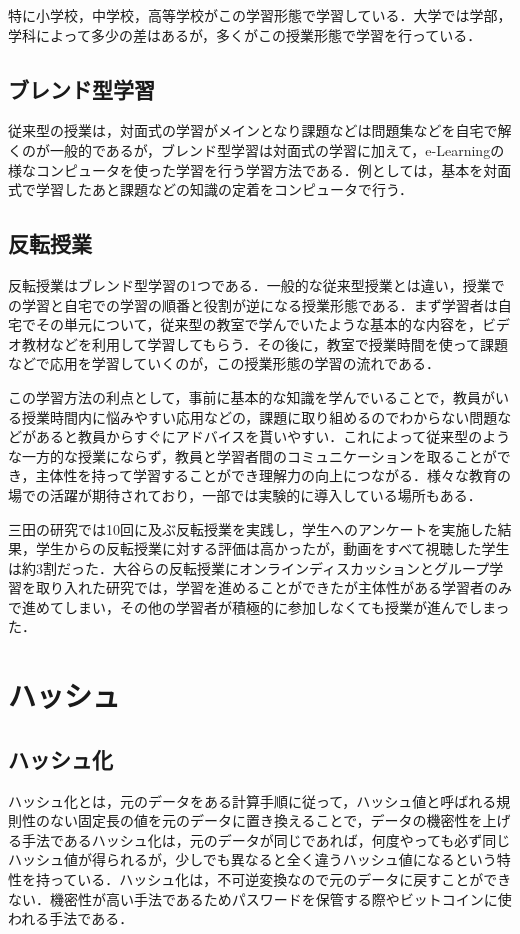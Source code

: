 \documentclass[a4j,11pt]{jsarticle}
\begin{document}
特に小学校，中学校，高等学校がこの学習形態で学習している．大学では学部，学科によって多少の差はあるが，多くがこの授業形態で学習を行っている．

\subsection{ブレンド型学習}
従来型の授業は，対面式の学習がメインとなり課題などは問題集などを自宅で解くのが一般的であるが，ブレンド型学習は対面式の学習に加えて，e-Learningの様なコンピュータを使った学習を行う学習方法である．例としては，基本を対面式で学習したあと課題などの知識の定着をコンピュータで行う．\newpage

\subsection{反転授業}
反転授業はブレンド型学習の1つである．一般的な従来型授業とは違い，授業での学習と自宅での学習の順番と役割が逆になる授業形態である．まず学習者は自宅でその単元について，従来型の教室で学んでいたような基本的な内容を，ビデオ教材などを利用して学習してもらう．その後に，教室で授業時間を使って課題などで応用を学習していくのが，この授業形態の学習の流れである．

この学習方法の利点として，事前に基本的な知識を学んでいることで，教員がいる授業時間内に悩みやすい応用などの，課題に取り組めるのでわからない問題などがあると教員からすぐにアドバイスを貰いやすい．これによって従来型のような一方的な授業にならず，教員と学習者間のコミュニケーションを取ることができ，主体性を持って学習することができ理解力の向上につながる．様々な教育の場での活躍が期待されており，一部では実験的に導入している場所もある．

三田の研究では10回に及ぶ反転授業を実践し，学生へのアンケートを実施した結果，学生からの反転授業に対する評価は高かったが，動画をすべて視聴した学生は約3割だった\cite{1}．大谷らの反転授業にオンラインディスカッションとグループ学習を取り入れた研究では，学習を進めることができたが主体性がある学習者のみで進めてしまい，その他の学習者が積極的に参加しなくても授業が進んでしまった\cite{2}．

\newpage

\section{ハッシュ}
\subsection{ハッシュ化}
ハッシュ化とは，元のデータをある計算手順に従って，ハッシュ値と呼ばれる規則性のない固定長の値を元のデータに置き換えることで，データの機密性を上げる手法であるハッシュ化は，元のデータが同じであれば，何度やっても必ず同じハッシュ値が得られるが，少しでも異なると全く違うハッシュ値になるという特性を持っている．ハッシュ化は，不可逆変換なので元のデータに戻すことができない．機密性が高い手法であるためパスワードを保管する際やビットコインに使われる手法である．
\end{document}

